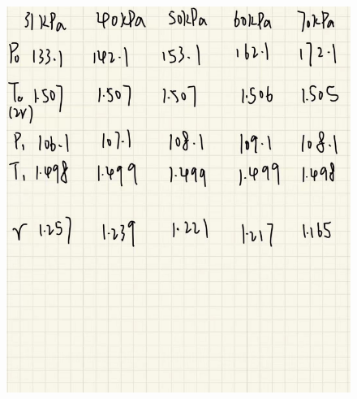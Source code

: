 \documentclass[UTF8]{article}
\begin{document}
\begin{appendix}
\begin{figure}[H]
	            	\includegraphics[clip,scale=0.5,trim={0 0 0 0}]{fig/fig15.png}
	            	\label{figure.15}
	\end{figure}

	
	\end{appendix}
	
	
	
\end{document}
